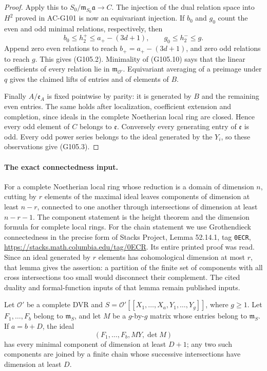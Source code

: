 \begin{proof}
Apply this to
\(S_0/\mathfrak m_{S_0}\mathfrak a\to C\).
The injection of the dual relation space into \(H^2\)
proved in AC-G101 is now an equivariant injection.  If
\(b_0\) and \(g_0\) count the even and odd minimal relations,
respectively, then
\[
            b_0\le h_2^+\le a_+-(3d+1),
            \qquad g_0\le h_2^-\le g.
 \tag{G105.11}
\]
Append zero even relations to reach \(b_+=a_+-(3d+1)\),
and zero odd relations to reach \(g\).  This gives (G105.2).
Minimality of (G105.10) says that the linear coefficients of
every relation lie in \(\mathfrak m_{\mathcal O'}\).
Equivariant averaging of a preimage under \(q\) gives the
claimed lifts of entries and of elements of \(B\).

Finally \(A/\mathfrak e_A\) is fixed pointwise by parity:
it is generated by \(B\) and the remaining even entries.
The same holds after localization, coefficient extension
and completion, since ideals in the complete Noetherian
local ring are closed.  Hence every odd element of \(C\)
belongs to \(\mathfrak e\).  Conversely every generating
entry of \(\mathfrak e\) is odd.  Every odd power series
belongs to the ideal generated by the \(Y_i\), so these
observations give (G105.3).
\end{proof}

\paragraph{The exact connectedness input.}
For a complete Noetherian local ring whose reduction is a
domain of dimension \(n\), cutting by \(r\) elements of
the maximal ideal leaves components of dimension at least
\(n-r\), connected to one another through intersections
of dimension at least \(n-r-1\).
The component statement is the height theorem and the
dimension formula for complete local rings.  For the chain
statement we use Grothendieck connectedness in the precise
form of Stacks Project, Lemma 52.14.1, tag
\texttt{0ECR}, \url{https://stacks.math.columbia.edu/tag/0ECR}.
Its entire printed proof was read.  Since an ideal generated
by \(r\) elements has cohomological dimension at most \(r\),
that lemma gives the assertion: a partition of the finite
set of components with all cross intersections too small
would disconnect their complement.  The cited duality and
formal-function inputs of that lemma remain published inputs.

\begin{lemma}
\label{G105-detsection}
Let \(\mathcal O'\) be a complete DVR and
\(S=\mathcal O'[[X_1,\ldots,X_a,Y_1,\ldots,Y_g]]\),
where \(g\ge1\).  Let \(F_1,\ldots,F_b\) belong to
\(\mathfrak m_S\), and let \(M\) be a \(g\)-by-\(g\)
matrix whose entries belong to \(\mathfrak m_S\).
If \(a=b+D\), the ideal
\[
                         (F_1,\ldots,F_b,MY,\det M)
 \tag{G105.12}
\]
has every minimal component of dimension at least \(D+1\);
any two such components are joined by a finite chain whose
successive intersections have dimension at least \(D\).
\end{lemma}


